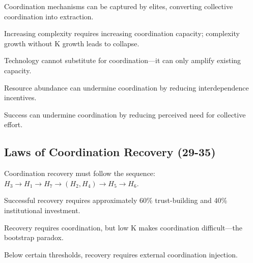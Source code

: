 \documentclass[12pt,letterpaper]{article}
\begin{document}
\begin{lawbox}
Coordination mechanisms can be captured by elites, converting collective coordination into extraction.
\end{lawbox}

\begin{lawbox}
Increasing complexity requires increasing coordination capacity; complexity growth without K growth leads to collapse.
\end{lawbox}

\begin{lawbox}
Technology cannot substitute for coordination---it can only amplify existing capacity.
\end{lawbox}

\begin{lawbox}
Resource abundance can undermine coordination by reducing interdependence incentives.
\end{lawbox}

\begin{lawbox}
Success can undermine coordination by reducing perceived need for collective effort.
\end{lawbox}

\subsection{Laws of Coordination Recovery (29-35)}

\begin{lawbox}
Coordination recovery must follow the sequence: $H_3 \rightarrow H_1 \rightarrow H_7 \rightarrow (H_2, H_4) \rightarrow H_5 \rightarrow H_6$.
\end{lawbox}

\begin{lawbox}
Successful recovery requires approximately 60\% trust-building and 40\% institutional investment.
\end{lawbox}

\begin{lawbox}
Recovery requires coordination, but low K makes coordination difficult---the bootstrap paradox.
\end{lawbox}

\begin{lawbox}
Below certain thresholds, recovery requires external coordination injection.
\end{lawbox}
\end{document}
